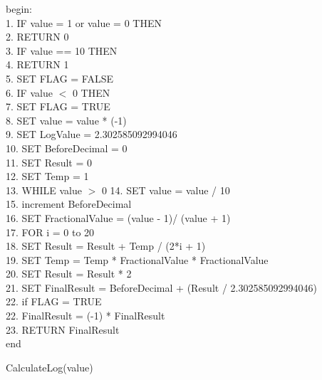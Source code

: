 \documentclass[a4paper, 11pt]{article}
\begin{document}
\begin{algorithm}
begin:\\
1.  IF value = 1 or value = 0 THEN\\
2. \hspace{3em} RETURN 0\\
3. IF value == 10 THEN\\
4. \hspace{3em} RETURN 1\\
5. SET FLAG = FALSE\\
6. IF value $<$ 0 THEN\\
7. \hspace{3em} SET FLAG = TRUE \\
8. \hspace{3em} SET value = value * (-1)\\
9. SET LogValue = 2.302585092994046\\
10. SET BeforeDecimal = 0 \\
11. SET Result = 0 \\
12. SET Temp = 1 \\
13. WHILE value $>$ 0
14. \hspace{3em} SET value = value / 10 \\
15. \hspace{3em} increment BeforeDecimal \\
16. SET FractionalValue = (value - 1)/ (value + 1)\\
17. FOR i = 0 to 20\\
18. \hspace{3em} SET Result = Result + Temp / (2*i + 1)\\
19. \hspace{3em} SET Temp = Temp * FractionalValue * FractionalValue\\
20. SET Result = Result * 2 \\
21. SET FinalResult = BeforeDecimal + (Result / 2.302585092994046)\\
22. if FLAG = TRUE\\
22. \hspace{3em}FinalResult = (-1) * FinalResult\\
23. RETURN FinalResult\\
end
\caption{CalculateLog(value)}
\end{algorithm}
\end{document}
